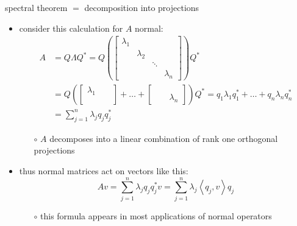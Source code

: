 \documentclass[10pt,hyperref]{beamer}
\newcommand{\ip}[2]{\left<#1,#2\right>}
\begin{document}
\begin{frame}{spectral theorem $=$ decomposition into projections}

\begin{itemize}
\item consider this calculation for $A$ normal:
\small
\begin{align*}
A &= Q\Lambda Q^* = Q \left(\begin{bmatrix} \lambda_1 & & & \\ & \lambda_2 & & \\ & & \ddots & \\ & & & \lambda_n \end{bmatrix}\right) Q^* \\
  &= Q \left(\begin{bmatrix} \lambda_1 & & \\ & & \\ & & \end{bmatrix} + \dots + \begin{bmatrix} & & \\ & & \\ & & \lambda_n \end{bmatrix}\right) Q^* = q_1 \lambda_1 q_1^* + \dots + q_n \lambda_n q_n^* \\
  &= \sum_{j=1}^n \lambda_j q_j q_j^*
\end{align*}
\normalsize

    \vspace{-2mm}
    \begin{itemize}
    \item[$\circ$] $A$ decomposes into a linear combination of rank one orthogonal projections
    \end{itemize}

\medskip
\item thus normal matrices act on vectors like this:
    $$A v = \sum_{j=1}^n \lambda_j q_j q_j^*v = \sum_{j=1}^n \lambda_j \ip{q_j}{v} q_j$$

    \vspace{-2mm}
    \begin{itemize}
    \item[$\circ$] this formula appears in most applications of normal operators
    \end{itemize}
\end{itemize}
\end{frame}
\end{document}
